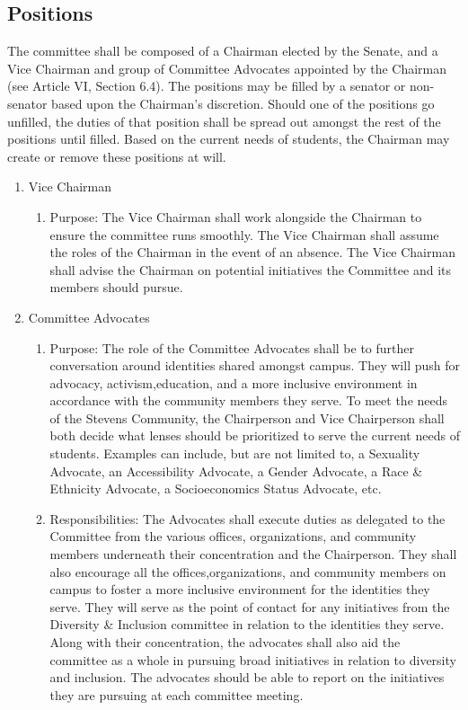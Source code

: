 \documentclass[12pt]{scrreprt}
\begin{document}
\subsection{Positions}
The committee shall be composed of a Chairman elected by the Senate, and a Vice Chairman and
group of Committee Advocates appointed by the Chairman (see Article VI, Section 6.4). The
positions may be filled by a senator or non-senator based upon the Chairman’s discretion. Should
one of the positions go unfilled, the duties of that position shall be spread out amongst the rest of
the positions until filled. Based on the current needs of students, the Chairman may create or
remove these positions at will.
\begin{enumerate}
    \item Vice Chairman
\begin{enumerate}
    \item Purpose: The Vice Chairman shall work alongside the Chairman to ensure the committee runs
smoothly. The Vice Chairman shall assume the roles of the Chairman in the event of an
absence. The Vice Chairman shall advise the Chairman on potential initiatives the
Committee and its members should pursue.
    \end{enumerate}
    \item Committee Advocates
    \begin{enumerate}
        \item Purpose: The role of the Committee Advocates shall be to further conversation around identities shared amongst campus. They will push for advocacy, activism,education, and a more inclusive environment in accordance with the community members they serve. To meet the needs of the Stevens Community, the Chairperson and Vice Chairperson shall both decide what lenses should be prioritized to serve the current needs of students. Examples can include, but are not limited to, a Sexuality Advocate, an Accessibility Advocate, a Gender Advocate, a Race \& Ethnicity Advocate, a Socioeconomics Status Advocate, etc.
        \item Responsibilities: The Advocates shall execute duties as delegated to the Committee from the various offices, organizations, and community members underneath their concentration and the Chairperson. They shall also encourage all the offices,organizations, and community members on campus to foster a more inclusive environment for the identities they serve. They will serve as the point of contact for any initiatives from the Diversity \& Inclusion committee in relation to the identities they serve. Along with their concentration, the advocates shall also aid the committee as a whole in pursuing broad initiatives in relation to diversity and inclusion. The advocates should be able to report on the initiatives they are pursuing at each committee meeting.
\end{enumerate}
\end{enumerate}
\end{document}
